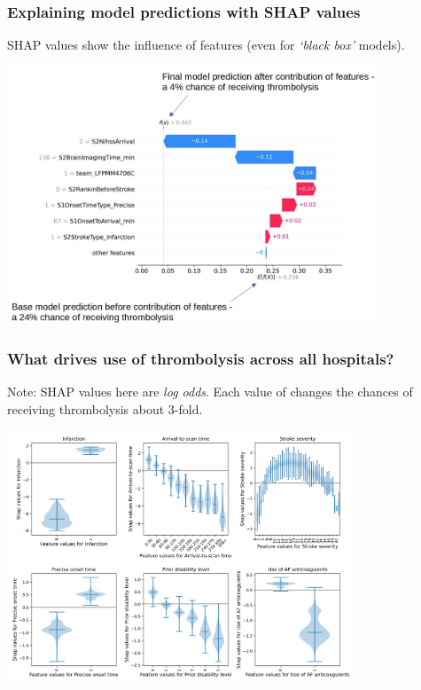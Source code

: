 \documentclass{beamer}
\begin{document}

\begin{frame}
\frametitle{Explaining model predictions with SHAP values}

SHAP values show the influence of features (even for \emph{`black box'} models).

\begin{center}
\includegraphics[width=0.83\textwidth]{./images/xgb_waterfall_low_probability.jpg}
\end{center}
\end{frame}



\begin{frame}
\frametitle{What drives use of thrombolysis across all hospitals?}

\footnotesize{Note: SHAP values here are \emph{log odds}. Each value of  changes the chances of receiving thrombolysis about 3-fold. \\}

\begin{center}
\includegraphics[width=0.78\textwidth]{./images/xgb_thrombolysis_shap_violin.jpg}
\end{center}
\end{frame}
\end{document}
